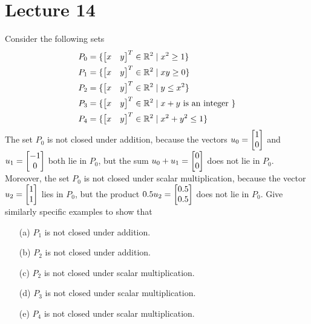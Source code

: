 \documentclass[a4paper]{amsart}
\begin{document}
\section{Lecture 14}

\begin{exercise}\label{ex-subspace-i}
 Consider the following sets
 \begin{align*}
  P_0 &= \{\left[\begin{matrix} x&y\end{matrix}\right]^T \in{\mathbb{R}}^2\;|\; x^2\geq 1\} \\
  P_1 &= \{\left[\begin{matrix} x&y\end{matrix}\right]^T\in{\mathbb{R}}^2\;|\; xy\geq 0\} \\
  P_2 &= \{\left[\begin{matrix} x&y\end{matrix}\right]^T\in{\mathbb{R}}^2\;|\; y\leq x^2\} \\
  P_3 &= \{\left[\begin{matrix} x&y\end{matrix}\right]^T\in{\mathbb{R}}^2\;|\; x+y \text{ is an integer }\} \\
  P_4 &= \{\left[\begin{matrix} x&y\end{matrix}\right]^T\in{\mathbb{R}}^2\;|\; x^2+y^2\leq 1\} \\
 \end{align*}
 The set $P_0$ is not closed under addition, because the vectors
 $u_0=\left[\begin{matrix} 1\\0\end{matrix}\right]$ and $u_1=\left[\begin{matrix} -1\\0\end{matrix}\right]$ both lie in $P_0$, but
 the sum $u_0+u_1=\left[\begin{matrix} 0\\0\end{matrix}\right]$ does not lie in $P_0$.  Moreover, the
 set $P_0$ is not closed under scalar multiplication, because the
 vector $u_2=\left[\begin{matrix} 1\\1\end{matrix}\right]$ lies in $P_0$, but the product
 $0.5 u_2=\left[\begin{matrix} 0.5\\0.5\end{matrix}\right]$ does not lie in $P_0$.  Give similarly
 specific examples to show that
 \begin{itemize}
  \item[(a)] $P_1$ is not closed under addition. 
  \item[(b)] $P_2$ is not closed under addition. 
  \item[(c)] $P_2$ is not closed under scalar multiplication. 
  \item[(d)] $P_3$ is not closed under scalar multiplication. 
  \item[(e)] $P_4$ is not closed under scalar multiplication. 
 \end{itemize}
\end{exercise}
\end{document}
